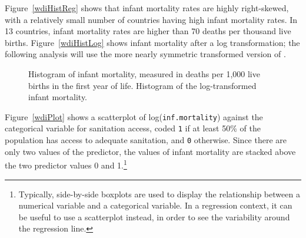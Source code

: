Figure~\ref{wdiHistReg} shows that infant mortality rates are highly right-skewed, with a relatively small number of countries having high infant mortality rates. In 13 countries, infant mortality rates are higher than 70 deaths per thousand live births. Figure~\ref{wdiHistLog} shows infant mortality after a log transformation; the following analysis will use the more nearly symmetric transformed version of .  

\begin{figure}[h!]
	\centering
	\caption{ Histogram of infant mortality, measured in deaths per 1,000 live births in the first year of life.  Histogram of the log-transformed infant mortality.}
	\label{wdiHistTransform}
\end{figure}

Figure~\ref{wdiPlot} shows a scatterplot of log(\texttt{inf.mortality}) against the categorical variable for sanitation access, coded \texttt{1} if at least 50\% of the population has access to adequate sanitation, and \texttt{0} otherwise. Since there are only two values of the predictor, the values of infant mortality are stacked above the two predictor values 0 and 1.\footnote{Typically, side-by-side boxplots are used to display the relationship between a numerical variable and a categorical variable. In a regression context, it can be useful to use a scatterplot instead, in order to see the variability around the regression line.} 


